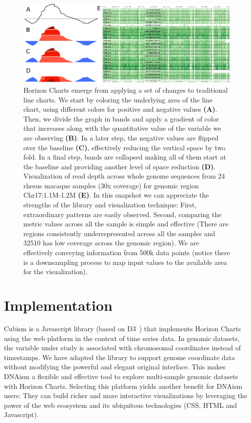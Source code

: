 \documentclass{bioinfo}
\begin{document}
\begin{figure}
\centerline{\includegraphics{figure.pdf}}
\caption{
Horizon Charts emerge from applying a set of changes to
traditional line charts. We start by coloring the underlying area of the line
chart, using different colors for positive and negative values \textbf{(A)}. Then, we
divide the graph in bands and apply a gradient of color that increases along
with the quantitative value of the variable we are observing \textbf{(B)}. In a later
step, the negative values are flipped over the baseline \textbf{(C)}, effectively
reducing the vertical space by two fold. In a final step, bands are collapsed
making all of them start at the baseline and providing another level of space
reduction \textbf{(D)}.  Visualization of read depth across whole genome sequences from
24 rhesus macaque samples (30x coverage) for genomic region Chr17:1.1M-1.2M
\textbf{(E)}. In this snapshot we can appreciate the strengths of the library and
visualization technique: First, extraordinary patterns are easily observed.
Second, comparing the metric values across all the sample is simple and
effective (There are regions consistently underrepresented across all the
samples and 32510 has low coverage across the genomic region). We are
effectively conveying information from 500k data points (notice there is a
downsampling process to map input values to the available area for the
visualization).
}\label{fig:01}
\end{figure}



\section{Implementation}

Cubism is a Javascript library (based on D3~\citep{2011-d3}) that implements
Horizon Charts using the web platform in the context of time series data. In
genomic datasets, the variable under study is associated with chromosomal
coordinates instead of timestamps. We have adapted the library to support
genome coordinate data without modifying the powerful and elegant original
interface.  This makes DNAism a flexible and effective tool to explore
multi-sample genomic datasets with Horizon Charts. Selecting this platform
yields another benefit for DNAism users: They can build richer and more
interactive visualizations by leveraging the power of the web ecosystem and its
ubiquitous technologies (CSS, HTML and Javascript).
\end{document}
